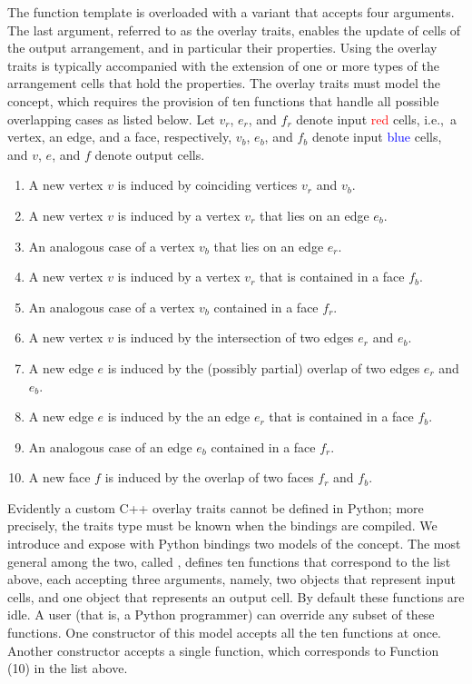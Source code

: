 The  function template is overloaded with a variant that accepts four arguments. The last argument, referred to as the overlay traits, enables the update of cells of the output arrangement, and in particular their properties. Using the overlay traits is typically accompanied with the extension of one or more types of the arrangement cells that hold the properties. The overlay traits must model the  concept, which requires the provision of ten functions that handle all possible overlapping cases as listed below. Let $v_r$, $e_r$, and $f_r$ denote input \textcolor{red}{red} cells, i.e.,~a vertex, an edge, and a face, respectively, $v_b$, $e_b$, and $f_b$ denote input \textcolor{blue}{blue} cells, and $v$, $e$, and $f$ denote output cells.
\begin{enumerate}
\item A new vertex $v$ is induced by coinciding vertices $v_r$ and $v_b$.
\item A new vertex $v$ is induced by a vertex $v_r$ that lies on an edge $e_b$.
\item An analogous case of a vertex $v_b$ that lies on an edge $e_r$.
\item A new vertex $v$ is induced by a vertex $v_r$ that is contained in a face $f_b$.
\item An analogous case of a vertex $v_b$ contained in a face $f_r$.
\item A new vertex $v$ is induced by the intersection of two edges $e_r$ and $e_b$.
\item A new edge $e$ is induced by the (possibly partial) overlap of two edges $e_r$ and $e_b$.
\item A new edge $e$ is induced by the an edge $e_r$ that is contained in a face $f_b$.
\item An analogous case of an edge $e_b$ contained in a face $f_r$.
\item A new face $f$ is induced by the overlap of two faces $f_r$ and $f_b$.
\end{enumerate}
Evidently a custom C++ overlay traits cannot be defined in Python; more precisely, the traits type must be known when the bindings are compiled. We introduce and expose with Python bindings two models of the  concept. The most general among the two, called , defines ten functions that correspond to the list above, each accepting three arguments, namely, two objects that represent input cells, and one object that represents an output cell. By default these functions are idle. A user (that is, a Python programmer) can override any subset of these functions. One constructor of this model accepts all the ten functions at once. Another constructor accepts a single function, which corresponds to Function (10) in the list above.

